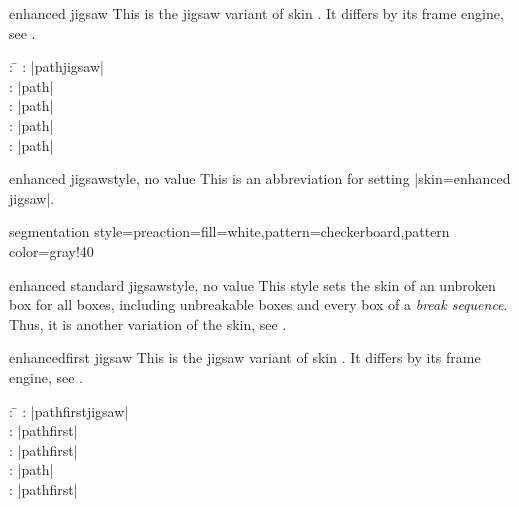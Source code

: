 \clearpage

\begin{docSkin}{enhanced jigsaw}
  This is the jigsaw variant of skin .
  It differs by its frame engine, see .
\begin{tcolorbox}[skintable=enhanced jigsaw]
  \begin{tabbing}
    : \=\kill
    :           \> |pathjigsaw|\\
    : \> |path|\\ 
    :        \> |path|\\
    :    \> |path|\\
    :           \> |path|
  \end{tabbing}
\end{tcolorbox}
\end{docSkin}

\begin{docTcbKey}{enhanced jigsaw}{}{style, no value}
  This is an abbreviation for setting |skin=enhanced jigsaw|.
\end{docTcbKey}


\begin{dispExample*}{segmentation style={preaction={fill=white},pattern=checkerboard,pattern color=gray!40}}
\end{dispExample*}


\begin{docTcbKey}[][doc new=2017-07-01]{enhanced standard jigsaw}{}{style, no value}
  This style sets the  skin of an unbroken box
  for all boxes, including unbreakable
  boxes and every box of a \emph{break sequence}. Thus, it is another variation
  of the  skin, see .
\end{docTcbKey}


\clearpage
\begin{docSkin}{enhancedfirst jigsaw}
  This is the jigsaw variant of skin .
  It differs by its frame engine, see .
\begin{tcolorbox}[skintable=enhancedfirst jigsaw]
  \begin{tabbing}
    : \=\kill
    :           \> |pathfirstjigsaw|\\
    : \> |pathfirst|\\ 
    :        \> |pathfirst|\\
    :    \> |path|\\
    :           \> |pathfirst|
  \end{tabbing}
\end{tcolorbox}
\end{docSkin}


